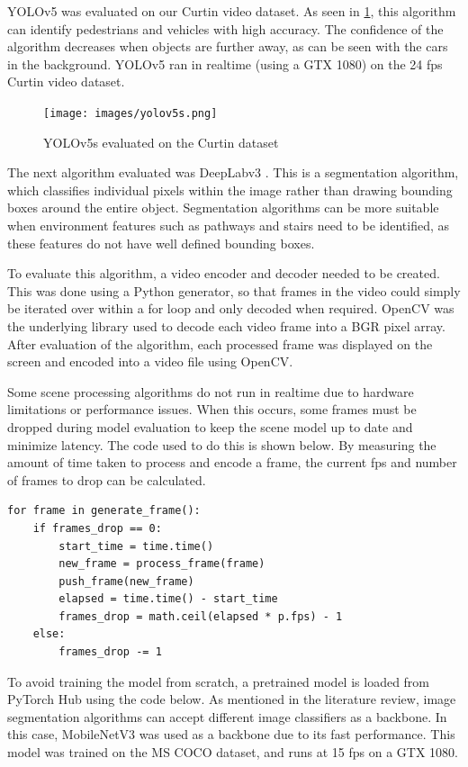 \documentclass[12pt]{article}
\begin{document}
YOLOv5 was evaluated on our Curtin video dataset. As seen in \cref{fig:yolov5s}, this algorithm can identify pedestrians and vehicles with high accuracy.
The confidence of the algorithm decreases when objects are further away, as can be seen with the cars in the background.
YOLOv5 ran in realtime (using a GTX 1080) on the 24 fps Curtin video dataset.

\begin{figure}[H]
    \centering
    \texttt{[image: images/yolov5s.png]}
    \caption{YOLOv5s evaluated on the Curtin dataset}
    \label{fig:yolov5s}
\end{figure}

The next algorithm evaluated was DeepLabv3 \cite{chenRethinkingAtrousConvolution2017}. This is a segmentation algorithm,
which classifies individual pixels within the image rather than drawing bounding boxes around the entire object.
Segmentation algorithms can be more suitable when environment features such as pathways and stairs need to be identified,
as these features do not have well defined bounding boxes.

To evaluate this algorithm, a video encoder and decoder needed to be created. This was done using a Python generator,
so that frames in the video could simply be iterated over within a for loop and only decoded when required.
OpenCV \cite{bradskiOpenCVLibrary2000} was the underlying library used to decode each video frame into a BGR pixel array.
After evaluation of the algorithm, each processed frame was displayed on the screen and encoded into a video file using OpenCV.

Some scene processing algorithms do not run in realtime due to hardware limitations or performance issues.
When this occurs, some frames must be dropped during model evaluation to keep the scene model up to date and minimize latency.
The code used to do this is shown below. By measuring the amount of time taken to process and encode a frame, the current fps
and number of frames to drop can be calculated.

\begin{verbatim}
for frame in generate_frame():
    if frames_drop == 0:
        start_time = time.time()
        new_frame = process_frame(frame)
        push_frame(new_frame)
        elapsed = time.time() - start_time
        frames_drop = math.ceil(elapsed * p.fps) - 1
    else:
        frames_drop -= 1
\end{verbatim}

To avoid training the model from scratch, a pretrained model is loaded from PyTorch Hub using the code below.
As mentioned in the literature review, image segmentation algorithms can accept different image classifiers as a backbone.
In this case, MobileNetV3 \cite{howardSearchingMobileNetV32019} was used as a backbone due to its fast performance.
This model was trained on the MS COCO \cite{linMicrosoftCOCOCommon2014} dataset, and runs at 15 fps on a GTX 1080.
\end{document}
